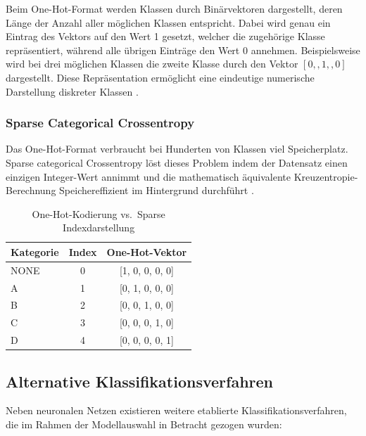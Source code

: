 Beim One-Hot-Format werden Klassen durch Binärvektoren dargestellt, deren Länge der Anzahl aller möglichen Klassen entspricht. Dabei wird genau ein Eintrag des Vektors auf den Wert 1 gesetzt, welcher die zugehörige Klasse repräsentiert, während alle übrigen Einträge den Wert 0 annehmen. Beispielsweise wird bei drei möglichen Klassen die zweite Klasse durch den Vektor $[0,,1,,0]$ dargestellt. Diese Repräsentation ermöglicht eine eindeutige numerische Darstellung diskreter Klassen \cite{OneHotEncoder}.

\subsubsection{Sparse Categorical Crossentropy}\label{ssub:sparse-cce}

Das One-Hot-Format verbraucht bei Hunderten von Klassen viel Speicherplatz. Sparse categorical Crossentropy löst dieses Problem indem der Datensatz einen einzigen Integer-Wert annimmt und die mathematisch äquivalente Kreuzentropie-Berechnung Speichereffizient im Hintergrund durchführt \cite{SparseCategoricalCrossentropy18:23:14+00:00, WhatSparseCategorical10:49:00+00:00}.

\begin{table}[H]
    \centering
    \label{tab:one-hot-codierung}
    \begin{tabular}{|l|c|c|}
        \hline
        \textbf{Kategorie} & \textbf{Index} & \textbf{One-Hot-Vektor} \\
        \hline
        NONE & 0 & [1, 0, 0, 0, 0] \\
        \hline
        A & 1 & [0, 1, 0, 0, 0] \\
        \hline
        B & 2 & [0, 0, 1, 0, 0] \\
        \hline
        C & 3 & [0, 0, 0, 1, 0] \\
        \hline
        D & 4 & [0, 0, 0, 0, 1] \\
        \hline
    \end{tabular}
    \caption{One-Hot-Kodierung vs.\ Sparse Indexdarstellung}
\end{table}

\subsection{Alternative Klassifikationsverfahren}\label{sub:alternative-klassifikatoren}

Neben neuronalen Netzen existieren weitere etablierte Klassifikationsverfahren, die im Rahmen der Modellauswahl in Betracht gezogen wurden:

